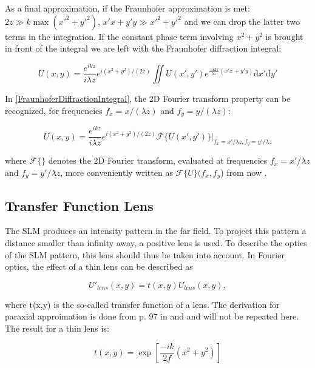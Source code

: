 As a final approximation, if the Fraunhofer approximation is met: $2z \gg k \max{(x'^2+y'^2)}$, $x'x+y'y \gg x'^2+y'^2$ and we can drop the latter two terms in the integration. If the constant phase term involving $x^2+y^2$ is brought in front of the integral we are left with the Fraunhofer diffraction integral:

\begin{equation}\label{FraunhoferDiffractionIntegral}
	U(x,y) = \frac{e^{i k z}}{i \lambda z} e^{i(x^2+y^2)/(2z)} \iint U(x',y') e^{\frac{-i 2 \pi}{\lambda z} (x'x+y'y)}\text{d}x' \text{d}y'
\end{equation}

In \cref{FraunhoferDiffractionIntegral}, the 2D Fourier transform property can be recognized, for frequencies $f_x=x/(\lambda z)$ and $f_y=y/(\lambda z)$:

\begin{equation}
	U(x,y)=\frac{e^{i k z}}{i \lambda z} e^{i(x^2+y^2)/(2z)} \mathscr{F}\{ U(x',y')\} 
	\Bigr\rvert_{f_x=x'/\lambda z,f_y=y'/\lambda z}
\end{equation}

where $\mathscr{F}\{\}$ denotes the 2D Fourier transform, evaluated at frequencies $f_x=x'/\lambda z$ and $f_y=y'/\lambda z$, more conveniently written as $\mathscr{F}\{U\}(f_x,f_y$) from now \cite{Bijnen2015}.

\subsection{Transfer Function Lens}

The SLM produces an intensity pattern in the far field. To project this pattern a distance smaller than infinity away, a positive lens is used. To describe the optics of the SLM pattern, this lens should thus be taken into account. In Fourier optics, the effect of a thin lens can be described as

\begin{equation}\label{lensTransfer}
	U'_{lens}(x,y) = t(x,y) U_{lens}(x,y),
\end{equation}

where t(x,y) is the so-called transfer function of a lens. The derivation for paraxial approimation is done from p. 97 in \cite{Goodman2005} and \cite{Dijk2012} and will not be repeated here. The result for a thin lens is:

\begin{equation}\label{transferFunction}
	t(x,y)=\exp{\left[\frac{-i k}{2 f}(x^2 + y^2)\right]}
\end{equation}

